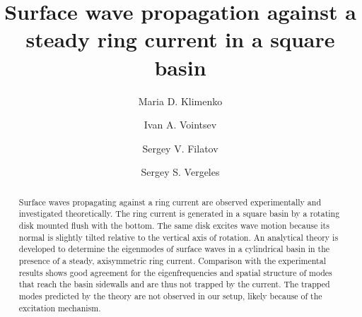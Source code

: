 \documentclass[aps,twocolumn]{revtex4-2}
\begin{document}
\title{Surface wave propagation against a steady ring current in a square basin}

\author{Maria D. Klimenko}






\author{Ivan A. Vointsev}




\author{Sergey V. Filatov}



\author{Sergey S. Vergeles}






\begin{abstract}
	Surface waves propagating against a ring current are observed experimentally and investigated theoretically. The ring current is generated in a square basin by a rotating disk mounted flush with the bottom. The same disk excites wave motion because its normal is slightly tilted relative to the vertical axis of rotation. An analytical theory is developed to determine the eigenmodes of surface waves in a cylindrical basin in the presence of a steady, axisymmetric ring current. Comparison with the experimental results shows good agreement for the eigenfrequencies and spatial structure of modes that reach the basin sidewalls and are thus not trapped by the current. The trapped modes predicted by the theory are not observed in our setup, likely because of the excitation mechanism.
\end{abstract}
\end{document}

